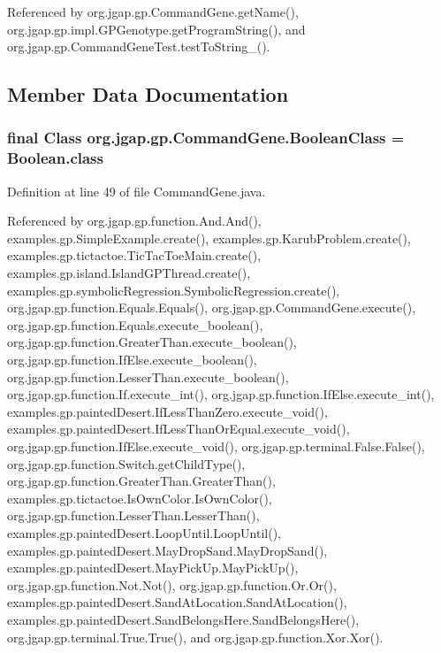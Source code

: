 Referenced by org.\-jgap.\-gp.\-Command\-Gene.\-get\-Name(), org.\-jgap.\-gp.\-impl.\-G\-P\-Genotype.\-get\-Program\-String(), and org.\-jgap.\-gp.\-Command\-Gene\-Test.\-test\-To\-String\-\_().



\subsection{Member Data Documentation}
\hypertarget{classorg_1_1jgap_1_1gp_1_1_command_gene_a5a4fe8e5d732bbd32363b683332808a7}{
\subsubsection[{Boolean\-Class}]{\setlength{\rightskip}{0pt plus 5cm}final Class org.\-jgap.\-gp.\-Command\-Gene.\-Boolean\-Class = Boolean.\-class\hspace{0.3cm}{\ttfamily [static]}}}\label{classorg_1_1jgap_1_1gp_1_1_command_gene_a5a4fe8e5d732bbd32363b683332808a7}


Definition at line 49 of file Command\-Gene.\-java.



Referenced by org.\-jgap.\-gp.\-function.\-And.\-And(), examples.\-gp.\-Simple\-Example.\-create(), examples.\-gp.\-Karub\-Problem.\-create(), examples.\-gp.\-tictactoe.\-Tic\-Tac\-Toe\-Main.\-create(), examples.\-gp.\-island.\-Island\-G\-P\-Thread.\-create(), examples.\-gp.\-symbolic\-Regression.\-Symbolic\-Regression.\-create(), org.\-jgap.\-gp.\-function.\-Equals.\-Equals(), org.\-jgap.\-gp.\-Command\-Gene.\-execute(), org.\-jgap.\-gp.\-function.\-Equals.\-execute\-\_\-boolean(), org.\-jgap.\-gp.\-function.\-Greater\-Than.\-execute\-\_\-boolean(), org.\-jgap.\-gp.\-function.\-If\-Else.\-execute\-\_\-boolean(), org.\-jgap.\-gp.\-function.\-Lesser\-Than.\-execute\-\_\-boolean(), org.\-jgap.\-gp.\-function.\-If.\-execute\-\_\-int(), org.\-jgap.\-gp.\-function.\-If\-Else.\-execute\-\_\-int(), examples.\-gp.\-painted\-Desert.\-If\-Less\-Than\-Zero.\-execute\-\_\-void(), examples.\-gp.\-painted\-Desert.\-If\-Less\-Than\-Or\-Equal.\-execute\-\_\-void(), org.\-jgap.\-gp.\-function.\-If\-Else.\-execute\-\_\-void(), org.\-jgap.\-gp.\-terminal.\-False.\-False(), org.\-jgap.\-gp.\-function.\-Switch.\-get\-Child\-Type(), org.\-jgap.\-gp.\-function.\-Greater\-Than.\-Greater\-Than(), examples.\-gp.\-tictactoe.\-Is\-Own\-Color.\-Is\-Own\-Color(), org.\-jgap.\-gp.\-function.\-Lesser\-Than.\-Lesser\-Than(), examples.\-gp.\-painted\-Desert.\-Loop\-Until.\-Loop\-Until(), examples.\-gp.\-painted\-Desert.\-May\-Drop\-Sand.\-May\-Drop\-Sand(), examples.\-gp.\-painted\-Desert.\-May\-Pick\-Up.\-May\-Pick\-Up(), org.\-jgap.\-gp.\-function.\-Not.\-Not(), org.\-jgap.\-gp.\-function.\-Or.\-Or(), examples.\-gp.\-painted\-Desert.\-Sand\-At\-Location.\-Sand\-At\-Location(), examples.\-gp.\-painted\-Desert.\-Sand\-Belongs\-Here.\-Sand\-Belongs\-Here(), org.\-jgap.\-gp.\-terminal.\-True.\-True(), and org.\-jgap.\-gp.\-function.\-Xor.\-Xor().

